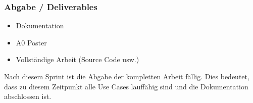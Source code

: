 \subsubsection{Abgabe / Deliverables}
\begin{itemize}
	\item Dokumentation
	\item A0 Poster
	\item Vollständige Arbeit (Source Code usw.)
\end{itemize}

Nach diesem Sprint ist die Abgabe der kompletten Arbeit fällig. Dies bedeutet, dass zu diesem Zeitpunkt alle Use Cases lauffähig sind und die Dokumentation abschlossen ist. 
